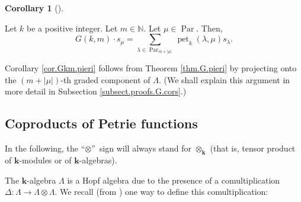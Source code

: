 \documentclass[numbers=enddot,12pt,final,onecolumn,notitlepage]{scrartcl}%
\theoremstyle{definition}
\newtheorem{coro}[theo]{Corollary}
\newenvironment{corollary}[1][]
{\begin{coro}[#1]\begin{leftbar}}
{\end{leftbar}\end{coro}}
\let\sumnonlimits\sum
\renewcommand{\sum}{\sumnonlimits\limits}
\begin{document}
\begin{corollary}
\label{cor.Gkm.pieri}Let $k$ be a positive integer. Let $m\in\mathbb{N}$. Let
$\mu\in\operatorname*{Par}$. Then,%
\[
G\left(  k,m\right)  \cdot s_{\mu}=\sum_{\lambda\in\operatorname*{Par}%
\nolimits_{m+\left\vert \mu\right\vert }}\operatorname*{pet}\nolimits_{k}%
\left(  \lambda,\mu\right)  s_{\lambda}.
\]

\end{corollary}


Corollary \ref{cor.Gkm.pieri} follows from Theorem \ref{thm.G.pieri} by
projecting onto the $\left(  m+\left\vert \mu\right\vert \right)  $-th graded
component of $\Lambda$. (We shall explain this argument in more detail in
Subsection \ref{subsect.proofs.G.cors}.)

\subsection{\label{subsect.thms.coprod}Coproducts of Petrie functions}

In the following, the \textquotedblleft$\otimes$\textquotedblright\ sign will
always stand for $\otimes_{\mathbf{k}}$ (that is, tensor product of
$\mathbf{k}$-modules or of $\mathbf{k}$-algebras).

The $\mathbf{k}$-algebra $\Lambda$ is a Hopf algebra due to the presence of a
comultiplication $\Delta:\Lambda\rightarrow\Lambda\otimes\Lambda$. We recall
(from \cite[\S 2.1]{GriRei}) one way to define this comultiplication:
\end{document}
